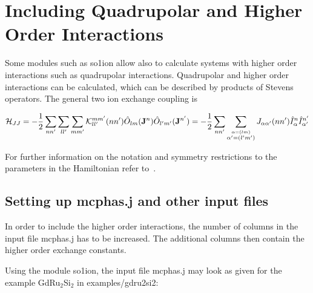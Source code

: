 \section{Including Quadrupolar and Higher Order Interactions}
\label{qint}


Some modules such as {\prg so1ion}
 allow also to calculate systems with higher order interactions such
as quadrupolar interactions. Quadrupolar and higher order interactions can be calculated, which
can be described by products of Stevens operators. The general two ion exchange coupling is

\begin{equation}
\label{multipolehamiltonrepeated}
 {\mathcal H}_{JJ}=
             -\frac{1}{2}  \sum_{nn'} \sum_ {ll'} \sum_{mm'}
     {\mathcal K}_{ll'}^{mm'}(nn') \hat O_{lm}({\mathbf J}^n) \hat O_{l'm'}({\mathbf J}^{n'})
=-\frac{1}{2}  \sum_{nn'} \sum_{\stackrel{\alpha=(lm)}{ \alpha'=(l'm')}} J_{\alpha\alpha'}(nn') 
\hat I_{\alpha}^n \hat I_{\alpha'}^{n'}
\end{equation}

For further information on the notation and symmetry restrictions to the
parameters in the Hamiltonian refer to~\cite{jensen91-1}.


\subsection{Setting up {\prg mcphas.j} and other input files}

In order to include the higher order interactions, the number of columns in the input file
{\prg mcphas.j} has to be increased. The additional columns then
 contain the higher order exchange constants.

Using the module {\prg so1ion}, the input file {\prg mcphas.j} may look as given for the 
example GdRu$_2$Si$_2$ in {\prg examples/gdru2si2}:

